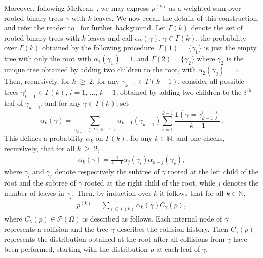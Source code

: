 \documentclass[10pt,a4paper]{article}
\renewcommand{\geq}{\;\geqslant\;}
\newcommand{\ind}{\mathbf{1}}
\newcommand{\cP}{\mathcal{P}}
\newcommand{\bbN}{\mathbb{N}}
\let\a=\alpha
\let\g=\gamma
\let\G=\Gamma
\let\O=\Omega
\begin{document}
Moreover, following McKean~\cite{mckean}, we may express $p^{(k)}$ as a weighted sum over rooted binary trees $\g$ with $k$ leaves. We now recall the details of this construction, and refer the reader to~\cite{carlenwild} for further background. Let $\G(k)$ denote the set of rooted binary trees with $k$ leaves and call $\alpha_k(\gamma)$, $\g\in\G(k)$, the probability over $\G(k)$ obtained by the following procedure. $\G(1)=\{\g_1\}$ is just the empty tree with only the root with $\a_1(\g_1)=1$, and $\G(2)=\{\g_2\}$ where $\g_2$ is the unique tree obtained by adding two children to the root, with $\a_2(\g_2)=1$. Then, recursively, for $k\geq 2$, for any $\g_{k-1}\in\G(k-1)$, consider all possible trees $\g_{k-1}^i\in\G(k)$, $i=1,\,\dots,\,k-1$, obtained by adding two children to the $i^{\rm th}$ leaf of $\g_{k-1}$, and for any $\g\in\G(k)$, set
\[
\a_k(\g)=\sum_{\g_{k-1}\,\in\,\G(k-1)}\a_{k-1}(\g_{k-1})\sum_{i=1}^{k-1} \frac{\ind\left(\g=\g_{k-1}^i\right)}{k-1}\,.
\]
This defines a probability $\a_k$ on $\G(k)$, for any $k\in\bbN$, and one checks, recursively, that for all $k\geq 2$,
\begin{align}\label{eqreca}
\a_k(\g)=\frac1{k-1}\a_j(\g_l)\a_{k-j}(\g_r),
\end{align}
where $\g_l$ and $\g_r$ denote respectively the subtree of $\g$ rooted at the left child of the root and the subtree of $\g$ rooted at the right child of the root, while $j$ denotes the number of leaves in $\g_l$. Then, by induction over $k$ it follows that for all $k\in\bbN$,
\begin{align}\label{eq00}
p^{(k)} = \sum_{\g\,\in\,\Gamma(k)}\alpha_k(\g)C_{\gamma}(p),
\end{align}
where $C_{\gamma}(p)\in\cP(\O)$ is described as follows. Each internal node of $\g$ represents a collision and the tree $\g$ describes the collision history. Then $C_\g(p)$ represents the distribution obtained at the root after all collisions from $\g$ have been performed, starting with the distribution $p$ at each leaf of $\g$.
\end{document}
